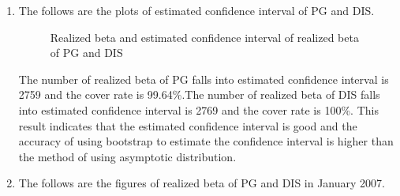 \documentclass[12pt,letterpaper]{article}
\begin{document}
\begin{enumerate}[label=\textbf{(\Alph*)}]
\item The follows are the plots of estimated confidence interval of PG and DIS.

\begin{figure}[H]
            \centering
            \caption{Realized beta and estimated confidence interval of realized beta of PG and DIS}
\end{figure}


The number of realized beta of PG falls into estimated confidence interval is 2759 and the cover rate is 99.64\%.The number of realized beta of DIS falls into estimated confidence interval is 2769 and the cover rate is 100\%. This result indicates that the estimated confidence interval is good and the accuracy of using bootstrap to estimate the confidence interval is higher than the method of using asymptotic distribution. \\

\item The follows are the figures of realized beta of PG and DIS in January 2007.


\end{enumerate}
\end{document}
